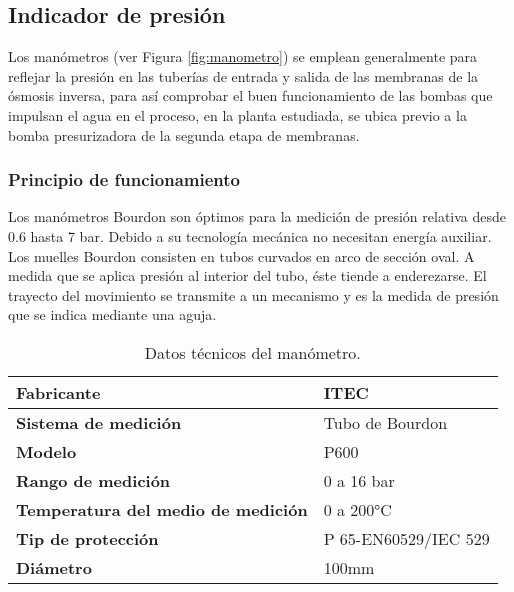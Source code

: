 \subsection{Indicador de presión}
Los manómetros (ver Figura \ref{fig:manometro}) se emplean generalmente para reflejar
la presión en las tuberías de entrada y salida de las membranas de la ósmosis
inversa, para así comprobar el buen funcionamiento de las bombas que impulsan
el agua en el proceso, en la planta estudiada, se ubica previo a la bomba
presurizadora de la segunda etapa de membranas.\\

\subsubsection*{Principio de funcionamiento}

Los manómetros Bourdon son óptimos para la medición de presión
relativa desde 0.6 hasta 7 bar. Debido a su tecnología mecánica no necesitan
energía auxiliar. Los muelles Bourdon consisten en tubos curvados en arco de
sección oval. A medida que se aplica presión al interior del tubo, éste tiende a
enderezarse. El trayecto del movimiento se transmite a un mecanismo y es la
medida de presión que se indica mediante una aguja.\\



\renewcommand{\arraystretch}{2}
\begin{table}[H]
    \centering
    \caption{Datos técnicos del manómetro.}
    \label{table:manometro}
    \begin{tabular}{| L{5cm} | L{5cm} |}
        \hline
        \textbf{Fabricante} & ITEC  \\
        \hline
        \textbf{Sistema de medición} & Tubo de Bourdon  \\
        \hline
        \textbf{Modelo} & P600  \\
        \hline
        \textbf{Rango de medición} & 0 a 16 bar  \\
        \hline
        \textbf{Temperatura del medio de medición} & 0 a 200°C  \\
        \hline
        \textbf{Tip de protección} & P 65-EN60529/IEC 529  \\
        \hline
        \textbf{Diámetro} & 100mm  \\
        \hline
     
  
    \end{tabular}
\end{table}
